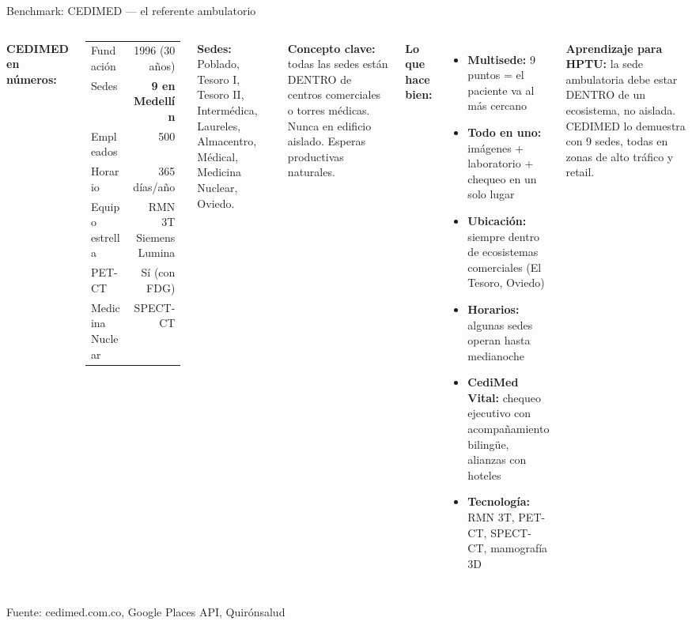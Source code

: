 \documentclass[aspectratio=169, 11pt]{beamer}
\begin{document}
\begin{frame}{Benchmark: CEDIMED --- el referente ambulatorio}

\begin{columns}[T]
\vspace{2pt}
{\scriptsize\textbf{CEDIMED en números:}}
\vspace{2pt}

{\scriptsize
\begin{tabular}{@{}lr@{}}
\toprule
Fundación & 1996 (30 años) \\
Sedes & \textbf{9 en Medellín} \\
Empleados & 500 \\
Horario & 365 días/año \\
Equipo estrella & RMN 3T Siemens Lumina \\
PET-CT & Sí (con FDG) \\
Medicina Nuclear & SPECT-CT \\
\bottomrule
\end{tabular}
}

\vspace{3pt}
{\scriptsize\textbf{Sedes:} Poblado, Tesoro I, Tesoro II, Intermédica, Laureles, Almacentro, Médical, Medicina Nuclear, Oviedo.}

\vspace{3pt}
{\scriptsize\textbf{Concepto clave:} todas las sedes están DENTRO de centros comerciales o torres médicas. Nunca en edificio aislado. Esperas productivas naturales.}

\vspace{2pt}
{\scriptsize\textbf{Lo que hace bien:}}
\vspace{2pt}

{\scriptsize
\begin{itemize}\setlength{\itemsep}{2pt}
  \item \textbf{Multisede:} 9 puntos = el paciente va al más cercano
  \item \textbf{Todo en uno:} imágenes + laboratorio + chequeo en un solo lugar
  \item \textbf{Ubicación:} siempre dentro de ecosistemas comerciales (El Tesoro, Oviedo)
  \item \textbf{Horarios:} algunas sedes operan hasta medianoche
  \item \textbf{CediMed Vital:} chequeo ejecutivo con acompañamiento bilingüe, alianzas con hoteles
  \item \textbf{Tecnología:} RMN 3T, PET-CT, SPECT-CT, mamografía 3D
\end{itemize}
}

\vspace{3pt}
{\scriptsize\textcolor{hptu}{\textbf{Aprendizaje para HPTU:} la sede ambulatoria debe estar DENTRO de un ecosistema, no aislada. CEDIMED lo demuestra con 9 sedes, todas en zonas de alto tráfico y retail.}}
\end{columns}

{\tiny\color{slate} Fuente: cedimed.com.co, Google Places API, Quirónsalud}
\end{frame}
\end{document}
